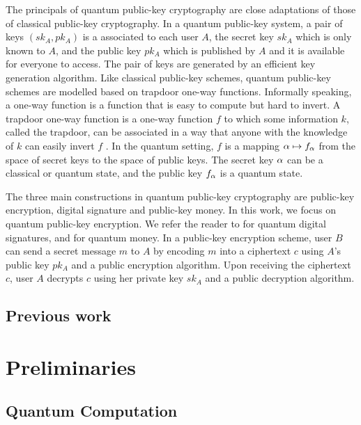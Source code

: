 \documentclass[11pt]{article}
\theoremstyle{plain}
\theoremstyle{definition}
\let\ket\relax
\DeclarePairedDelimiter{\ket}{\lvert}{\rangle}
\begin{document}
The principals of quantum public-key cryptography are close adaptations of those of classical public-key cryptography. In a quantum public-key system, a pair of keys $(sk_A, pk_A)$ is a associated to each user $A$, the secret key $sk_A$ which is only known to $A$, and the public key $pk_A$ which is published by $A$ and it is available for everyone to access. The pair of keys are generated by an efficient key generation algorithm. Like classical public-key schemes, quantum public-key schemes are modelled based on trapdoor one-way functions. Informally speaking, a one-way function is a function that is easy to compute but hard to invert. A trapdoor one-way function is a one-way function $f$ to which some information $k$, called the trapdoor, can be associated in a way that anyone with the knowledge of $k$ can easily invert $f$ \cite{boneh2015graduate}. In the quantum setting, $f$ is a mapping $\ket{\alpha} \mapsto \ket{f_\alpha}$ from the space of secret keys to the space of public keys. The secret key $\ket{\alpha}$ can be a classical or quantum state, and the public key $\ket{f_\alpha}$ is a quantum state. 

The three main constructions in quantum public-key cryptography are public-key encryption, digital signature and public-key money. In this work, we focus on quantum public-key encryption. We refer the reader to \cite{gottesman2001quantum} for quantum digital signatures, and \cite{aaronson2009quantum, aaronson2012quantum, farhi2012quantum} for quantum money. In a public-key encryption scheme, user $B$ can send a secret message $m$ to $A$ by encoding $m$ into a ciphertext $c$ using $A$'s public key $pk_A$ and a public encryption algorithm. Upon receiving the ciphertext $c$, user $A$ decrypts $c$ using her private key $sk_A$ and a public decryption algorithm. 


\subsection{Previous work}






\section{Preliminaries}
\label{sec:preli}



\subsection{Quantum Computation}
\end{document}
